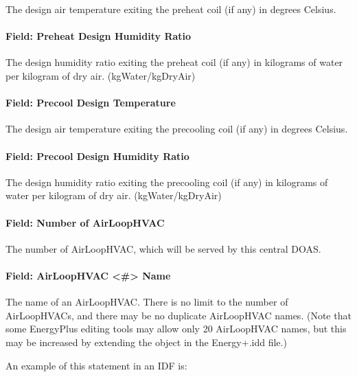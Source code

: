 The design air temperature exiting the preheat coil (if any) in degrees Celsius.

\paragraph{Field: Preheat Design Humidity Ratio}\label{field-preheat-design-humidity-ratio}

The design humidity ratio exiting the preheat coil (if any) in kilograms of water per kilogram of dry air. (kgWater/kgDryAir)

\paragraph{Field: Precool Design Temperature}\label{field-precool-design-temperature}

The design air temperature exiting the precooling coil (if any) in degrees Celsius.

\paragraph{Field: Precool Design Humidity Ratio}\label{field-precool-design-humidity-ratio}

The design humidity ratio exiting the precooling coil (if any) in kilograms of water per kilogram of dry air. (kgWater/kgDryAir)

\paragraph{Field: Number of AirLoopHVAC}\label{field-number-of-airloophvac}

The number of AirLoopHVAC, which will be served by this central DOAS.

\paragraph{Field: AirLoopHVAC \textless{}\#\textgreater{} Name}\label{field-airloophvac-name}

The name of an AirLoopHVAC. There is no limit to the number of AirLoopHVACs, and there may be no duplicate AirLoopHVAC names. (Note that some EnergyPlus editing tools may allow only 20 AirLoopHVAC names, but this may be increased by extending the object in the Energy+.idd file.)

An example of this statement in an IDF is:

